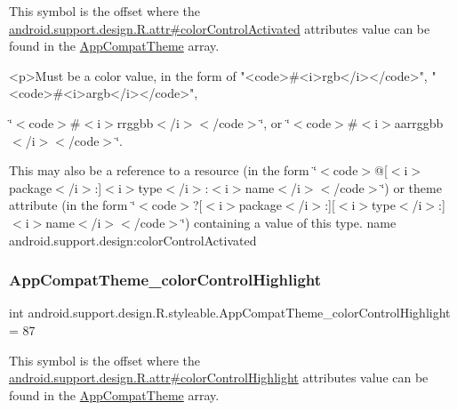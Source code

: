 This symbol is the offset where the \hyperlink{classandroid_1_1support_1_1design_1_1R_1_1attr_aa2f7d231aef973a9d4c53d7e334f5467}{android.\+support.\+design.\+R.\+attr\#color\+Control\+Activated} attribute\textquotesingle{}s value can be found in the \hyperlink{classandroid_1_1support_1_1design_1_1R_1_1styleable_afb351dc8de20cbd4c89abe360373010c}{App\+Compat\+Theme} array.

\begin{DoxyVerb}      <p>Must be a color value, in the form of "<code>#<i>rgb</i></code>", "<code>#<i>argb</i></code>",
\end{DoxyVerb}
 \char`\"{}$<$code$>$\#$<$i$>$rrggbb$<$/i$>$$<$/code$>$\char`\"{}, or \char`\"{}$<$code$>$\#$<$i$>$aarrggbb$<$/i$>$$<$/code$>$\char`\"{}. 

This may also be a reference to a resource (in the form \char`\"{}$<$code$>$@\mbox{[}$<$i$>$package$<$/i$>$\+:\mbox{]}$<$i$>$type$<$/i$>$\+:$<$i$>$name$<$/i$>$$<$/code$>$\char`\"{}) or theme attribute (in the form \char`\"{}$<$code$>$?\mbox{[}$<$i$>$package$<$/i$>$\+:\mbox{]}\mbox{[}$<$i$>$type$<$/i$>$\+:\mbox{]}$<$i$>$name$<$/i$>$$<$/code$>$\char`\"{}) containing a value of this type.  name android.\+support.\+design\+:color\+Control\+Activated \mbox{\label{classandroid_1_1support_1_1design_1_1R_1_1styleable_a08a5b7e63a775cd41fec28def9a2e28f}} 
\subsubsection{\texorpdfstring{App\+Compat\+Theme\+\_\+color\+Control\+Highlight}{AppCompatTheme\_colorControlHighlight}}
{\footnotesize\ttfamily int android.\+support.\+design.\+R.\+styleable.\+App\+Compat\+Theme\+\_\+color\+Control\+Highlight = 87\hspace{0.3cm}{\ttfamily [static]}}

This symbol is the offset where the \hyperlink{classandroid_1_1support_1_1design_1_1R_1_1attr_acdaa061c93eac490ef28917ae15d14c6}{android.\+support.\+design.\+R.\+attr\#color\+Control\+Highlight} attribute\textquotesingle{}s value can be found in the \hyperlink{classandroid_1_1support_1_1design_1_1R_1_1styleable_afb351dc8de20cbd4c89abe360373010c}{App\+Compat\+Theme} array.

